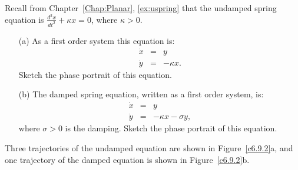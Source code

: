 \documentclass{ximera}
\begin{document}
\begin{exercise} \label{c6.9.2}
Recall from Chapter~\ref{Chap:Planar}, \eqref{ex:uspring} that the undamped
spring equation is $\frac{d^2x}{dt^2} + \kappa x = 0$, where $\kappa>0$.
\begin{itemize}
\item[(a)]   As a first order system this equation is:
\begin{eqnarray*}
\dot{x} & = & y \\
\dot{y} & = & -\kappa x.
\end{eqnarray*}
Sketch the phase portrait of this equation.
\item[(b)]  The damped spring equation, written as a first order system, is:
\begin{eqnarray*}
\dot{x} & = & y \\
\dot{y} & = & -\kappa x-\sigma y,
\end{eqnarray*}
where $\sigma>0$ is the damping.  Sketch the phase portrait of this equation.
\end{itemize}

\begin{solution}

Three trajectories of the undamped equation are shown in Figure~\ref{c6.9.2}a,
and one trajectory of the damped equation is shown in Figure~\ref{c6.9.2}b.




\begin{figure}[htb]
                       \centerline{%
                       }
\end{figure}

\end{solution}
\end{exercise}
\end{document}
